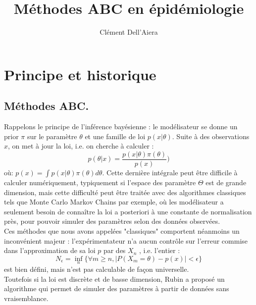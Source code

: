 \documentclass{article}
\title{Méthodes ABC en épidémiologie}
\author{ Cl\'ement Dell'Aiera}
\date{}
\theoremstyle{definition}
\begin{document}
\maketitle

\begin{abstract}

\end{abstract}


\newpage
\tableofcontents

\newpage

\setlength{\parindent}{0cm}

\section{Principe et historique}

\subsection{Méthodes ABC.}

Rappelons le principe de l'inférence bayésienne : le modélisateur se donne un prior $\pi$ sur le paramètre $\theta$ et une famille de loi $p(x|\theta)$. Suite à des observations $x$, on met à jour la loi, i.e. on cherche à calculer :
\[p(\theta|x)=\frac{p(x|\theta)\pi(\theta)}{p(x)})\]
où: $p(x)=\int p(x|\theta)\pi(\theta) d\theta$. Cette dernière intégrale peut être difficile à calculer numériquement, typiquement si l'espace des paramètre $\Theta$ est de grande dimension, mais cette difficulté peut être traitée avec des algorithmes classiques tels que Monte Carlo Markov Chains par exemple, où les modélisateur a seulement besoin de connaître la loi a posteriori à une constante de normalisation près, pour pouvoir simuler des paramètres selon des données observées.\\

Ces méthodes que nous avons appelées "classiques" comportent néanmoins un inconvénient majeur : l'expérimentateur n'a aucun contrôle sur l'erreur commise dans l'approximation de sa loi $p$ par des $X_n$ , i.e. l'entier :
\[N_\epsilon = \inf_{n}\{\forall m\geq n,|P(X_m=\theta)-p(x)|<\epsilon\}\]
est bien défini, mais n'est pas calculable de façon universelle. \\

Toutefois si la loi est discrète et de basse dimension, Rubin a proposé un algorithme qui permet de simuler des paramètres à partir de données sans vraisemblance.\\
\end{document}
